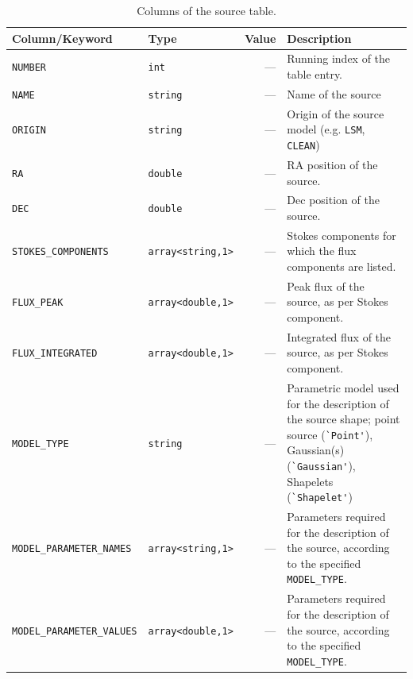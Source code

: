 \documentclass[a4paper,10pt,bibtotoc]{scrartcl}
\begin{document}
\begin{table}[htbp]
  \centering
  \begin{tabular}{|llrp{7cm}|}
    \hline
    \sc Column/Keyword & \sc Type & \sc Value & \sc Description \\
    \hline \hline
    \small\verb|NUMBER|    & \small\verb|int|    & --- & Running index
    of the table entry. \\
    \small\verb|NAME|      & \small\verb|string| & --- & Name of the source \\
    \small\verb|ORIGIN|    & \small\verb|string| & --- & Origin of the
    source model (e.g. \texttt{LSM}, \texttt{CLEAN}) \\
    \small\verb|RA|        & \small\verb|double|  & --- & RA position of the source. \\
    \small\verb|DEC|       & \small\verb|double|  & --- & Dec position of the source. \\
    \small\verb|STOKES_COMPONENTS| & \small\verb|array<string,1>|  &
    --- & Stokes components for which the flux components are listed. \\
   \small\verb|FLUX_PEAK| & \small\verb|array<double,1>| & --- & Peak flux of the source,
    as per Stokes component. \\
    \small\verb|FLUX_INTEGRATED| & \small\verb|array<double,1>| & --- &
    Integrated flux of the source, as per Stokes component. \\
    \small\verb|MODEL_TYPE| & \small\verb|string| & --- & Parametric
    model used for the description of the source shape; point source
    (\verb|`Point'|), Gaussian(s) (\verb|`Gaussian'|), Shapelets (\verb|`Shapelet'|) \\
    \small\verb|MODEL_PARAMETER_NAMES| & \small\verb|array<string,1>|
    & --- & Parameters required for the description of the source,
    according to the specified \verb|MODEL_TYPE|. \\
    \small\verb|MODEL_PARAMETER_VALUES| & \small\verb|array<double,1>|
    & --- & Parameters required for the description of the source,
    according to the specified \verb|MODEL_TYPE|. \\
    \hline
  \end{tabular}
  \caption{Columns of the source table.}
  \label{tab:source table columns}
\end{table}

\end{document}
